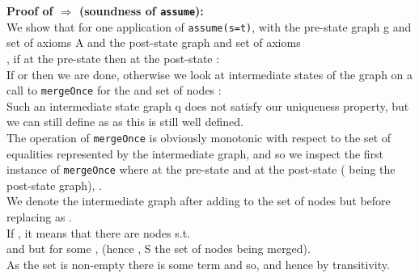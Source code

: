 \begin{theorem}
\textbf{Proof of $\Rightarrow$ (soundness of \lstinline|assume|):} \\
We show that for one application of \lstinline|assume(s=t)|, with the pre-state graph g and set of axioms A and the post-state graph  and set of axioms \\
, if at the pre-state  then at the post-state :\\ 
If  or  then we are done, 
otherwise we look at intermediate states of the graph on a call to \lstinline|mergeOnce| for the \GFA{}  and set of nodes :\\
Such an intermediate state graph q does not satisfy our uniqueness property, 
but we can still define  as  as this is still well defined.\\
The operation of \lstinline|mergeOnce| is obviously monotonic with respect to the set of equalities represented by the intermediate graph, 
and so we inspect the first instance of \lstinline|mergeOnce| where at the pre-state  and at the post-state ( being the post-state graph), .\\
We denote the intermediate graph after adding  to the set of nodes but before replacing \GFAs{} as .\\
If , it means that there are nodes  s.t. \\
 and  but for some \GFA{} ,  
(hence , S the set of nodes being merged).\\
As the set  is non-empty there is some term  and so,
 and hence  by transitivity.


\end{theorem}
